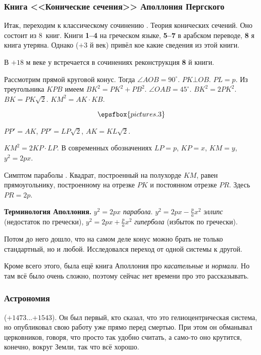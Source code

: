 \documentclass[a4paper,oneside,fleqn,10pt]{article}
\newcommand{\pe}[2]{${#1}\ldots{#2}$}
\newcommand{\cpic}[1]{$$\epsfbox{pictures.#1}$$}
\begin{document}
\subsubsection{Книга <<Конические сечения>> Аполлония Пергского}

Итак, переходим к классическому сочинению
. Теория конических сечений.  Оно состоит
из 8~книг. Книги \textbf{1--4} на греческом языке, \textbf{5--7} в
арабском переводе, \textbf{8} я книга утеряна.  Однако 
($+3$ й век) привёл кое какие сведения из этой книги.

В $+18$ м веке у  встречается в сочинениях
реконструкция \textbf{8} й книги.

Рассмотрим прямой круговой конус. Тогда $\angle AOB = 90^\circ$. $PK
\bot OB$. $PL = p$.  Из треугольника $KPB$ имеем $BK^2 = PK^2 + PB^2$.
$\angle OAB = 45^\circ$. $BK^2 = 2PK^2$. $BK = PK\sqrt2$.  $KM^2 =
AK\cdot KB$.

\cpic{3}

$PP' = AK$, $PP' = LP\sqrt2$, $AK = KL\sqrt2$.

$KM^2 = 2KP\cdot LP$. В современных обозначениях $LP = p$, $KP = x$,
$KM = y$, $y^2 = 2px$.

Симптом параболы .  Квадрат,
построенный на полухорде $KM$, равен прямоугольнику, построенному на
отрезке $PK$ и постоянном отрезке $PR$.  Здесь $PR = 2p$.

\textbf{Терминология Аполлония.}  $y^2 = 2px$ \emph{парабола}.  $y^2 =
2px - \frac pa x^2$ \emph{эллипс} (недостаток по гречески), $y^2 = 2px
+ \frac pa x^2$ \emph{гипербола} (избыток по гречески).

Потом до него дошло, что на самом деле конус можно брать не только
стандартный, но и любой. Исследовался переход от одной системы к
другой.

Кроме всего этого, была ещё книга Аполлония про \emph{касательные} и
\emph{нормали}.  Но там всё было очень сложно, поэтому сейчас нет
времени про это рассказывать.

\subsubsection{Астрономия}

 (\pe{+1473}{+1543}). Он был первый, кто сказал, что
это гелиоцентрическая система, но опубликовал свою работу уже прямо
перед смертью.  При этом он обманывал церковников, говоря, что просто
так удобно считать, а само-то оно крутится, конечно, вокруг Земли, так
что всё хорошо.
\end{document}
